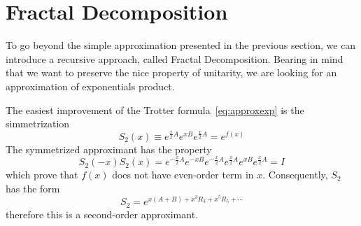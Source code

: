 \section{Fractal Decomposition}

To go beyond the simple approximation presented in the previous section, we can introduce a recursive approach, called Fractal Decomposition. Bearing in mind that we want to preserve the nice property of unitarity, we are looking for an approximation of exponentials product.

The easiest improvement of the Trotter formula~\ref{eq:approxexp} is the simmetrization
\begin{equation}
S_2(x) \equiv e^{\frac{x}{2}A} e^{xB} e^{\frac{x}{2}A} = e^{f(x)}
\end{equation}
The symmetrized approximant has the property
\begin{equation}
S_2(-x) S_2(x) = e^{-\frac{x}{2}A} e^{-xB} e^{-\frac{x}{2}A} e^{\frac{x}{2}A} e^{xB} e^{\frac{x}{2}A} = I
\end{equation}
which prove that $f(x)$ does not have even-order term in $x$. Consequently, $S_2$ has the form
\begin{equation}
S_2 = e^{x(A+B) + x^3R_3 + x^5R_5 + \cdots}
\end{equation}
therefore this is a second-order approximant.

